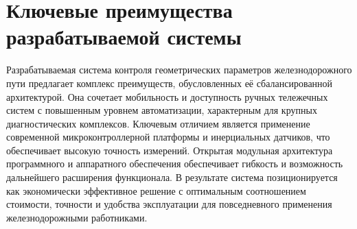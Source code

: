 
\section{Ключевые преимущества разрабатываемой системы}
\label{sec:advantages}

Разрабатываемая система контроля геометрических параметров железнодорожного пути предлагает комплекс преимуществ, обусловленных её сбалансированной архитектурой. Она сочетает мобильность и доступность ручных тележечных систем с повышенным уровнем автоматизации, характерным для крупных диагностических комплексов. Ключевым отличием является применение современной микроконтроллерной платформы и инерциальных датчиков, что обеспечивает высокую точность измерений. Открытая модульная архитектура программного и аппаратного обеспечения обеспечивает гибкость и возможность дальнейшего расширения функционала. В результате система позиционируется как экономически эффективное решение с оптимальным соотношением стоимости, точности и удобства эксплуатации для повседневного применения железнодорожными работниками. 




